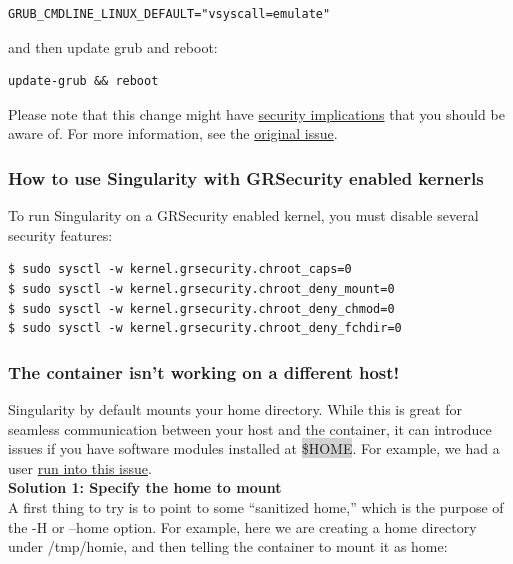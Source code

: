 \documentclass[a4paper]{article}
\begin{document}
\begin{lstlisting}[frame=single]
GRUB_CMDLINE_LINUX_DEFAULT="vsyscall=emulate"
\end{lstlisting}

and then update grub and reboot:

\begin{lstlisting}[frame=single]
update-grub && reboot
\end{lstlisting}

Please note that this change might have \href{https://git.kernel.org/pub/scm/linux/kernel/git/torvalds/linux.git/tree/Documentation/admin-guide/kernel-parameters.txt?h=v4.13-rc3#n4387}{security implications} that you should be aware of. For more information, see the \href{https://github.com/singularityware/singularity/issues/845}{original issue}.

\subsubsection{How to use Singularity with GRSecurity enabled kernerls}
To run Singularity on a GRSecurity enabled kernel, you must disable several security features:\\[0.1in]

\begin{lstlisting}[frame=single]
$ sudo sysctl -w kernel.grsecurity.chroot_caps=0
$ sudo sysctl -w kernel.grsecurity.chroot_deny_mount=0
$ sudo sysctl -w kernel.grsecurity.chroot_deny_chmod=0
$ sudo sysctl -w kernel.grsecurity.chroot_deny_fchdir=0
\end{lstlisting}


\subsubsection{The container isn't working on a different host!}

Singularity by default mounts your home directory. While this is great for seamless communication between your host and the container, it can introduce issues if you have software modules installed at \colorbox{lightgray}{\$HOME}. For example, we had a user \href{https://github.com/singularityware/singularity/issues/476}{run into this issue}.\\

\textbf{Solution 1: Specify the home to mount}\\[0.1in]
A first thing to try is to point to some “sanitized home,” which is the purpose of the -H or --home option. For example, here we are creating a home directory under /tmp/homie, and then telling the container to mount it as home:
\end{document}
